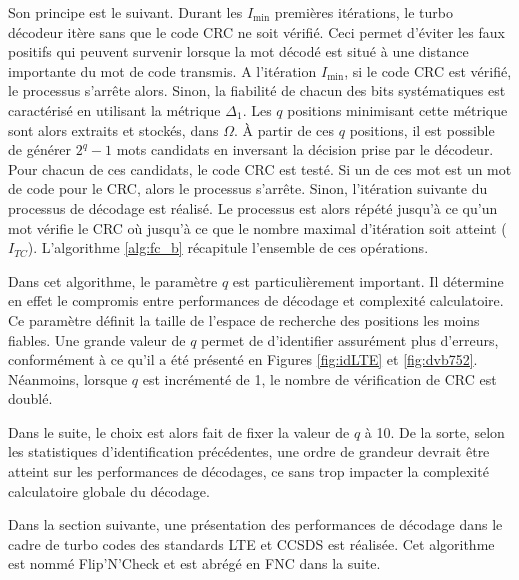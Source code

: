 Son principe est le suivant. Durant les $I_{\text{min}}$ premières itérations, le turbo décodeur itère sans que le code
CRC ne soit vérifié. Ceci permet d'éviter les faux positifs qui peuvent survenir lorsque la mot décodé est situé à une 
distance importante du mot de code transmis. A l'itération $I_{\text{min}}$, si le code CRC est vérifié, le processus
s'arrête alors. Sinon, la fiabilité de chacun des bits systématiques est caractérisé en utilisant la métrique $\Delta_1$.
Les $q$ positions minimisant cette métrique sont alors extraits et stockés, dans $\Omega$. À partir de ces $q$ positions,
il est possible de générer $2^q-1$ mots candidats en inversant la décision prise par le décodeur. Pour chacun de ces 
candidats, le code CRC est testé. Si un de ces mot est un mot de code pour le CRC, alors le processus s'arrête. Sinon, 
l'itération suivante du processus de décodage est réalisé. Le processus est alors répété jusqu'à ce qu'un mot vérifie le 
CRC où jusqu'à ce que le nombre maximal d'itération soit atteint ($I_{TC}$). L'algorithme \ref{alg:fc_b} récapitule l'ensemble de 
ces opérations.

Dans cet algorithme, le paramètre $q$ est particulièrement important. Il détermine en effet le compromis entre performances
de décodage et complexité calculatoire. Ce paramètre définit la taille de l'espace de recherche des positions les moins
fiables. Une grande valeur de $q$ permet de d'identifier assurément plus d'erreurs, conformément à ce qu'il a été
présenté en Figures \ref{fig:idLTE} et \ref{fig:dvb752}. Néanmoins, lorsque $q$ est incrémenté de 1, le nombre de 
vérification de CRC est doublé.

Dans le suite, le choix est alors fait de fixer la valeur de $q$ à 10. De la sorte, selon les statistiques d'identification 
précédentes, une ordre de grandeur devrait être atteint sur les performances de décodages, ce sans trop impacter la complexité
calculatoire globale du décodage.

Dans la section suivante, une présentation des performances de décodage dans le cadre de turbo codes des standards LTE
et CCSDS est réalisée. Cet algorithme est nommé Flip'N'Check et est abrégé en FNC dans la suite.


